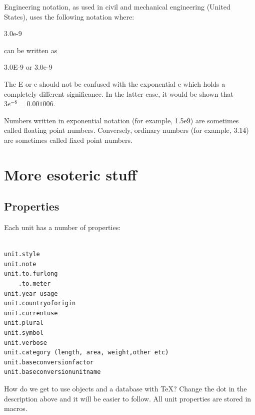 \documentclass{tufte-book}
\begin{document}
Engineering notation, as used in civil and mechanical engineering (United States), uses the following notation where:

3.0e-9

can be written as

3.0E-9 or 3.0e-9

The E or e should not be confused with the exponential e which holds a completely different significance. In the latter case, it would be shown that \(3e^{-8} = 0.001006\).


Numbers written in exponential notation (for example, 1.5e9) are sometimes called floating point numbers. Conversely, ordinary numbers (for example, 3.14) are sometimes called fixed point numbers.





\chapter{More esoteric stuff}
\section{Properties}
Each unit has a number of properties:

\begin{verbatim}

unit.style
unit.note
unit.to.furlong
    .to.meter
unit.year usage
unit.countryoforigin
unit.currentuse
unit.plural
unit.symbol
unit.verbose
unit.category (length, area, weight,other etc)
unit.baseconversionfactor
unit.baseconversionunitname
\end{verbatim}

How do we get to use objects and a database with TeX? Change the dot in the description above and it will be easier to follow. All unit properties are stored in macros.
\end{document}
